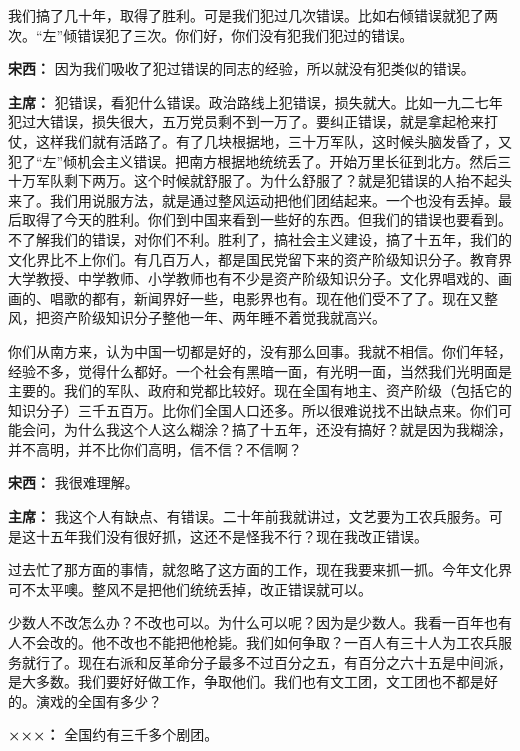 \begin{duihua}
我们搞了几十年，取得了胜利。可是我们犯过几次错误。比如右倾错误就犯了两次。“左”倾错误犯了三次。你们好，你们没有犯我们犯过的错误。

\item[\textbf{宋西：}] 因为我们吸收了犯过错误的同志的经验，所以就没有犯类似的错误。

\item[\textbf{主席：}] 犯错误，看犯什么错误。政治路线上犯错误，损失就大。比如一九二七年犯过大错误，损失很大，五万党员剩不到一万了。要纠正错误，就是拿起枪来打仗，这样我们就有活路了。有了几块根据地，三十万军队，这时候头脑发昏了，又犯了“左”倾机会主义错误。把南方根据地统统丢了。开始万里长征到北方。然后三十万军队剩下两万。这个时候就舒服了。为什么舒服了？就是犯错误的人抬不起头来了。我们用说服方法，就是通过整风运动把他们团结起来。一个也没有丢掉。最后取得了今天的胜利。你们到中国来看到一些好的东西。但我们的错误也要看到。不了解我们的错误，对你们不利。胜利了，搞社会主义建设，搞了十五年，我们的文化界比不上你们。有几百万人，都是国民党留下来的资产阶级知识分子。教育界大学教授、中学教师、小学教师也有不少是资产阶级知识分子。文化界唱戏的、画画的、唱歌的都有，新闻界好一些，电影界也有。现在他们受不了了。现在又整风，把资产阶级知识分子整他一年、两年睡不着觉我就高兴。

你们从南方来，认为中国一切都是好的，没有那么回事。我就不相信。你们年轻，经验不多，觉得什么都好。一个社会有黑暗一面，有光明一面，当然我们光明面是主要的。我们的军队、政府和党都比较好。现在全国有地主、资产阶级（包括它的知识分子）三千五百万。比你们全国人口还多。所以很难说找不出缺点来。你们可能会问，为什么我这个人这么糊涂？搞了十五年，还没有搞好？就是因为我糊涂，并不高明，并不比你们高明，信不信？不信啊？

\item[\textbf{宋西：}] 我很难理解。

\item[\textbf{主席：}] 我这个人有缺点、有错误。二十年前我就讲过，文艺要为工农兵服务。可是这十五年我们没有很好抓，这还不是怪我不行？现在我改正错误。

过去忙了那方面的事情，就忽略了这方面的工作，现在我要来抓一抓。今年文化界可不太平噢。整风不是把他们统统丢掉，改正错误就可以。

少数人不改怎么办？不改也可以。为什么可以呢？因为是少数人。我看一百年也有人不会改的。他不改也不能把他枪毙。我们如何争取？一百人有三十人为工农兵服务就行了。现在右派和反革命分子最多不过百分之五，有百分之六十五是中间派，是大多数。我们要好好做工作，争取他们。我们也有文工团，文工团也不都是好的。演戏的全国有多少？

\item[\textbf{×××：}] 全国约有三千多个剧团。


\end{duihua}
